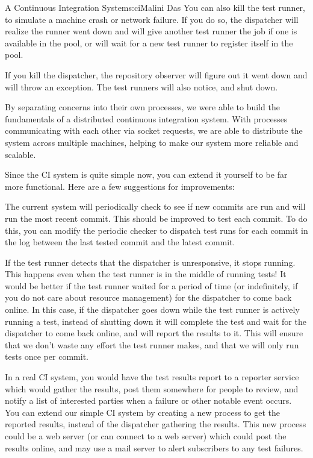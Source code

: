 \begin{aosachapter}{A Continuous Integration System}{s:ci}{Malini Das}
You can also kill the test runner, to simulate a machine crash or
network failure. If you do so, the dispatcher will realize the runner
went down and will give another test runner the job if one is available
in the pool, or will wait for a new test runner to register itself in
the pool.

If you kill the dispatcher, the repository observer will figure out it
went down and will throw an exception. The test runners will also
notice, and shut down.

\label{conclusion}

By separating concerns into their own processes, we were able to build
the fundamentals of a distributed continuous integration system. With
processes communicating with each other via socket requests, we are able
to distribute the system across multiple machines, helping to make our
system more reliable and scalable.

Since the CI system is quite simple now, you can extend it yourself to
be far more functional. Here are a few suggestions for improvements:

\label{per-commit-test-runs}

The current system will periodically check to see if new commits are run
and will run the most recent commit. This should be improved to test
each commit. To do this, you can modify the periodic checker to dispatch
test runs for each commit in the log between the last tested commit and
the latest commit.

\label{smarter-test-runners}

If the test runner detects that the dispatcher is unresponsive, it stops
running. This happens even when the test runner is in the middle of
running tests! It would be better if the test runner waited for a period
of time (or indefinitely, if you do not care about resource management)
for the dispatcher to come back online. In this case, if the dispatcher
goes down while the test runner is actively running a test, instead of
shutting down it will complete the test and wait for the dispatcher to
come back online, and will report the results to it. This will ensure
that we don't waste any effort the test runner makes, and that we will
only run tests once per commit.

\label{real-reporting}

In a real CI system, you would have the test results report to a
reporter service which would gather the results, post them somewhere for
people to review, and notify a list of interested parties when a failure
or other notable event occurs. You can extend our simple CI system by
creating a new process to get the reported results, instead of the
dispatcher gathering the results. This new process could be a web server
(or can connect to a web server) which could post the results online,
and may use a mail server to alert subscribers to any test failures.


\end{aosachapter}
